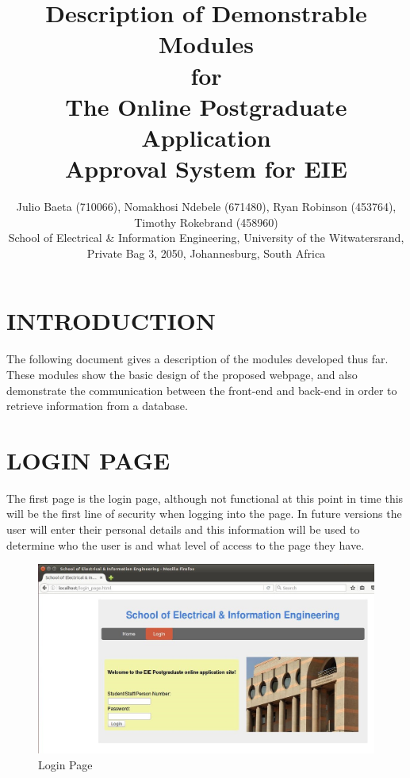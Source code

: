 \documentclass[journal,comsoc,onecolumn]{IEEEtran}
\begin{document}

\title{Description of Demonstrable Modules \\ \vspace{7mm} for \\ \vspace{7mm} The Online Postgraduate Application \\ Approval System for EIE}

\author{\vspace{3mm} Julio Baeta (710066), Nomakhosi Ndebele (671480), Ryan Robinson (453764), Timothy Rokebrand (458960)\\ \small \vspace{2mm} School of Electrical \& Information Engineering, University of the Witwatersrand, Private Bag 3, 2050, Johannesburg, South Africa}

\markboth{}{}

\maketitle

\thispagestyle{empty}


\newpage

\thispagestyle{empty}

\section{INTRODUCTION}
The following document gives a description of the modules developed thus far. These modules show the basic design of the proposed webpage, and also demonstrate the communication between the front-end and back-end in order to retrieve information from a database.

\section{LOGIN PAGE}
The first page is the login page, although not functional at this point in time this will be the first line of security when logging into the page.  In future versions the user will enter their personal details and this information will be used to determine who the user is and what level of access to  the page they have.

\begin{figure}[h]
\centering
\includegraphics[width=0.7\linewidth]{loginpage}
\caption{Login Page}
\label{fig:loginpage}
\end{figure}
\end{document}
